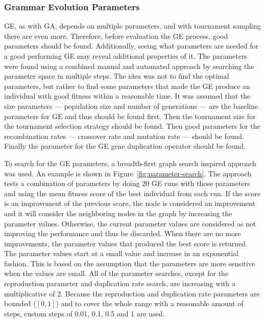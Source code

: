 
\subsubsection{Grammar Evolution Parameters}
\gls{GE}, as with \gls{GA}, depends on multiple parameters, and with tournament sampling there are even more.
Therefore, before evaluation the \gls{GE} process, good parameters should be found.
Additionally, seeing what parameters are needed for a good performing \gls{GE} may reveal additional properties of it.
The parameters were found using a combined manual and automated approach by searching the parameter space in multiple steps.
The idea was not to find the optimal parameters, but rather to find some parameters that made the \gls{GE} produce an individual with good fitness within a reasonable time.
It was assumed that the size parameters --- population size and number of generations --- are the baseline parameters for \gls{GE} and thus should be found first.
Then the tournament size for the tournament selection strategy should be found.
Then good parameters for the recombination rates --- crossover rate and mutation rate --- should be found.
Finally the parameter for the \gls{GE} gene duplication operator should be found.

To search for the \gls{GE} parameters, a breadth-first graph search inspired approach was used.
An example is shown in Figure~\ref{fig:parameter-search}.
The approach tests a combination of parameters by doing 20 \gls{GE} runs with those parameters and using the mean fitness score of the best individual from each run.
If the score is an improvement of the previous score, the node is considered an improvement and it will consider the neighboring nodes in the graph by increasing the parameter values.
Otherwise, the current parameter values are considered as not improving the performance and thus be discarded.
When there are no more improvements, the parameter values that produced the best score is returned.
The parameter values start at a small value and increase in an exponential fashion.
This is based on the assumption that the parameters are more sensitive when the values are small.
All of the parameter searches, except for the reproduction parameter and duplication rate search, are increasing with a multiplicative of 2.
Because the reproduction and duplication rate parameters are bounded ($[0, 1]$) and to cover the whole range with a reasonable amount of steps, custom steps of 0.01, 0.1, 0.5 and 1 are used.

